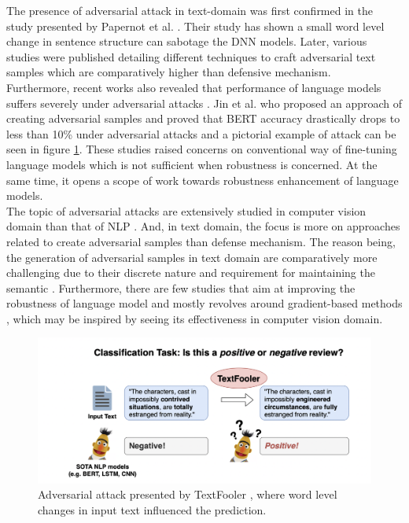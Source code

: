 \documentclass[%
	BCOR=8mm, %
	DIV=12,
	toc=bibliography, %
	toc=listof, %
	oneside, %
	egregdoesnotlikesansseriftitles, %
	]{scrbook}
\begin{document}
The presence of adversarial attack in text-domain was first confirmed in the study presented by Papernot et al. \cite{papernot_crafting_2016}. Their  study has shown  a small word level change in sentence structure can sabotage the DNN models. Later, various studies were published detailing different techniques to craft adversarial text samples which are comparatively higher than defensive mechanism. \\
Furthermore,  recent works also revealed that performance of language models suffers severely under adversarial attacks \cite{li_bert-attack_2020,garg_bae_2020,moradi_evaluating_2021}. Jin et al. \cite{jin_is_2020}  who proposed an approach of creating adversarial samples and proved that BERT accuracy drastically drops to less than 10\% under adversarial attacks and a pictorial example of attack can be seen in figure \ref{diag:ExampleAdversarial}. These studies raised concerns on conventional way of fine-tuning language models which is not sufficient when robustness is concerned. At the same time, it opens a scope of work towards robustness enhancement of language models.\\
The topic of adversarial attacks are extensively studied in computer vision domain than that of NLP \cite{wang_towards_2021}. And, in text domain, the focus is more on approaches related to create adversarial samples than defense mechanism. The reason being, the generation of adversarial samples in text domain are comparatively more challenging due to their discrete nature and requirement for maintaining the semantic \cite{li_bert-attack_2020}. Furthermore, there are few studies that aim at improving the robustness of language model and mostly revolves around gradient-based methods \cite{zhu_at-bert_2021,miyato_adversarial_2017,jiang_smart_2020-1}, which may be inspired by seeing its effectiveness in computer vision domain.\\
\begin{figure}[H]
    \centering
    \includegraphics[width=.90\textwidth]{img/Introduction-Fig-1.png}
    \caption[Example of Adversarial attack in text-domain]{Adversarial attack presented by TextFooler \cite{jin_is_2020}, where word level changes in input text influenced the prediction.}
    \label{diag:ExampleAdversarial}
\end{figure}
\end{document}
